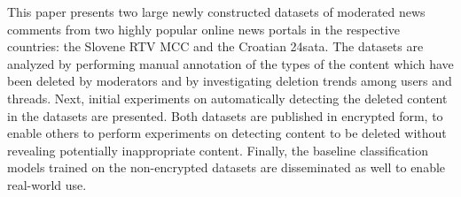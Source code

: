 This paper presents two large newly constructed datasets of moderated news comments from two highly popular online news portals in the respective countries: the Slovene RTV MCC and the Croatian 24sata. The datasets are analyzed by performing manual annotation of the types of the content which have been deleted by moderators and by investigating deletion trends among users and threads. Next, initial experiments on automatically detecting the deleted content in the datasets are presented. Both datasets are published in encrypted form, to enable others to perform experiments on detecting content to be deleted without revealing potentially inappropriate content. Finally, the baseline classification models trained on the non-encrypted datasets are disseminated as well to enable real-world use.
